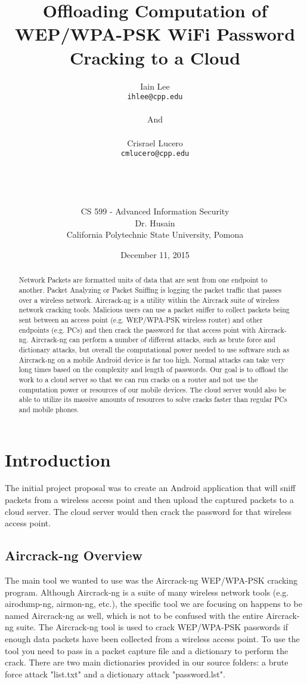 \documentclass[12pt, titlepage]{article}
\title{Offloading Computation of WEP/WPA-PSK WiFi Password Cracking to a Cloud}
\author{Iain Lee \\
  {\tt ihlee@cpp.edu} \\ \\ And \\ \\
  Crisrael Lucero \\
  {\tt cmlucero@cpp.edu} \\ \\ \\ \\ \\
  CS 599 - Advanced Information Security \\
  Dr. Husain \\
  California Polytechnic State University, Pomona
  \date{December 11, 2015}}
\begin{document}
\maketitle

\newpage

\begin{abstract}
Network Packets are formatted units of data that are sent from one endpoint to another. Packet Analyzing or Packet Sniffing is logging the packet traffic that passes over a wireless network. Aircrack-ng is a utility within the Aircrack suite of wireless network cracking tools. Malicious users can use a packet sniffer to collect packets being sent between an access point (e.g. WEP/WPA-PSK wireless router) and other endpoints (e.g. PCs) and then crack the password for that access point with Aircrack-ng. Aircrack-ng can perform a number of different attacks, such as brute force and dictionary attacks, but overall the computational power needed to use software such as Aircrack-ng on a mobile Android device is far too high. Normal attacks can take very long times based on the complexity and length of passwords. Our goal is to offload the work to a cloud server so that we can run cracks on a router and not use the computation power or resources of our mobile devices. The cloud server would also be able to utilize its massive amounts of resources to solve cracks faster than regular PCs and mobile phones.
\end{abstract}

\newpage

\section{Introduction}
The initial project proposal was to create an Android application that will sniff packets from a wireless access point and then upload the captured packets to a cloud server. The cloud server would then crack the password for that wireless access point.

\subsection{Aircrack-ng Overview}
The main tool we wanted to use was the Aircrack-ng WEP/WPA-PSK cracking program. Although Aircrack-ng is a suite of many wireless network tools (e.g. airodump-ng, airmon-ng, etc.), the specific tool we are focusing on happens to be named Aircrack-ng as well, which is not to be confused with the entire Aircrack-ng suite. The Aircrack-ng tool is used to crack WEP/WPA-PSK passwords if enough data packets have been collected from a wireless access point. To use the tool you need to pass in a packet capture file and a dictionary to perform the crack. There are two main dictionaries provided in our source folders: a brute force attack "list.txt" and a dictionary attack "password.lst". 
\end{document}
